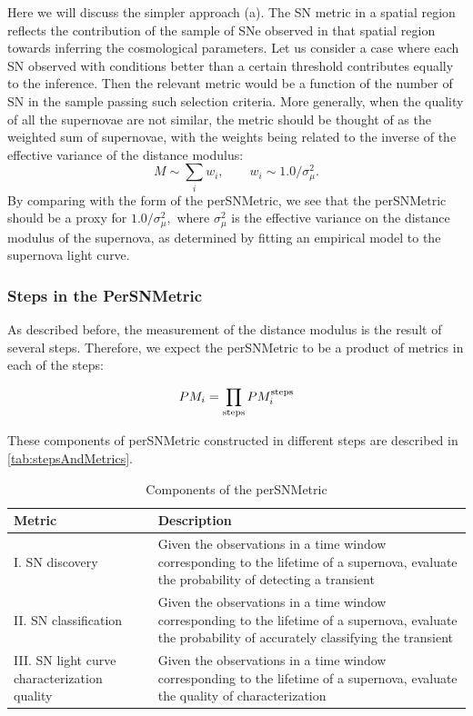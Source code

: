 Here we will discuss the simpler approach (a). The SN metric in a spatial region
reflects the contribution of the sample of SNe observed in that spatial
region towards inferring the cosmological parameters. Let us
consider a case where each SN observed with conditions better than a
certain threshold contributes equally to the inference. Then the relevant
metric would be a function of the number of SN in the sample passing
such selection criteria. More generally, when the quality of all the
supernovae are not similar, the metric should be thought of as
the weighted sum of supernovae, with the weights being related to the
inverse of the effective variance of the distance modulus:
\begin{equation}
M\sim \sum_i w_i , \qquad  w_i \sim 1.0 /\sigma^2_\mu.
\end{equation}
By comparing with the form of the perSNMetric, we see that the
perSNMetric should be a proxy for $1.0/\sigma^2_\mu,$ where
$\sigma^2_\mu$ is the effective variance on the distance
modulus of the supernova, as determined by fitting an empirical model to the supernova light curve.

\subsubsection{Steps in the PerSNMetric}
As described before, the measurement of the distance modulus is the
result of several steps. Therefore, we expect the perSNMetric to be a
product of metrics in each of the steps:

\begin{equation}
PM_i = \prod_{\rm{steps}} PM_i^{\rm{steps}}
\end{equation}

These components of perSNMetric constructed in different steps are
described in \autoref{tab:stepsAndMetrics}.
\begin{center}
 \begin{table}
\begin{tabular}{| p{5cm} |p{10cm}| }
\hline Metric & Description \\
\hline
I. SN discovery  &  Given the observations in a time window corresponding to the lifetime of a supernova, evaluate the  probability of detecting a
transient \\
II. SN classification & Given the observations in a time window corresponding to the lifetime of a 
supernova, evaluate the probability of accurately classifying the transient\\
III. SN light curve characterization quality & Given the observations in a time window corresponding to the lifetime of a supernova, evaluate the quality of characterization\\
\hline 
\end{tabular}
\caption{Components of the perSNMetric}
\label{tab:stepsAndMetrics}
\end{table}
\end{center}



